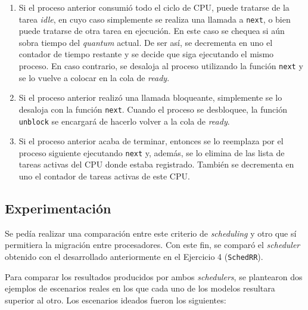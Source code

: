 \begin{enumerate}
    \item Si el proceso anterior consumió todo el ciclo de CPU, puede tratarse
    de la tarea \emph{idle}, en cuyo caso simplemente se realiza una llamada a
    \texttt{next}, o bien puede tratarse de otra tarea en ejecución. En este
    caso se chequea si aún sobra tiempo del \emph{quantum} actual. De ser así,
    se decrementa en uno el contador de tiempo restante y se decide que siga
    ejecutando el mismo proceso. En caso contrario, se desaloja al proceso
    utilizando la función \texttt{next} y se lo vuelve a colocar en la cola de
    \emph{ready}.
    \item Si el proceso anterior realizó una llamada bloqueante, simplemente se
    lo desaloja con la función \texttt{next}. Cuando el proceso se desbloquee,
    la función \texttt{unblock} se encargará de hacerlo volver a la cola de
    \emph{ready}.
    \item Si el proceso anterior acaba de terminar, entonces se lo reemplaza por
    el proceso siguiente ejecutando \texttt{next} y, además, se lo elimina de
    las lista de tareas activas del CPU donde estaba registrado. También se
    decrementa en uno el contador de tareas activas de este CPU.
\end{enumerate}

\subsection{Experimentación}

Se pedía realizar una comparación entre este criterio de \emph{scheduling}
y otro que sí permitiera la migración entre procesadores. Con este fin, se
comparó el \emph{scheduler} obtenido con el desarrollado anteriormente en el
Ejercicio 4 (\texttt{SchedRR}).

Para comparar los resultados producidos por ambos \emph{schedulers}, se
plantearon dos ejemplos de escenarios reales en los que cada uno de los modelos
resultara superior al otro. Los escenarios ideados fueron los siguientes:

